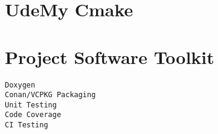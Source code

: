 \section{UdeMy Cmake}


\section{Project Software Toolkit}


\begin{verbatim}
Doxygen
Conan/VCPKG Packaging
Unit Testing
Code Coverage
CI Testing
\end{verbatim}




